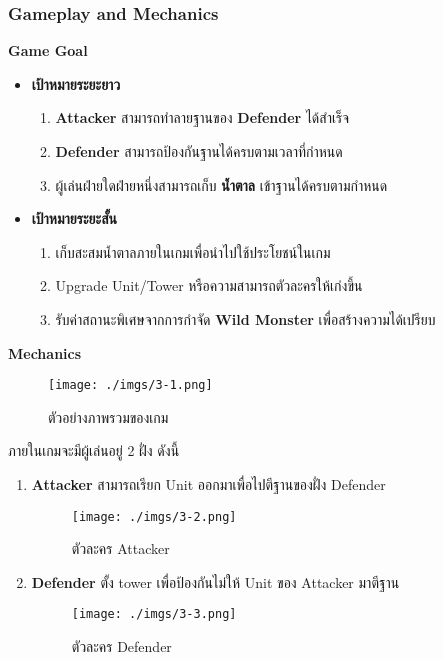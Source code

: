 \documentclass[12pt,oneside,openright,a4paper]{cpe-thai-project}
\begin{document}
\subsubsection{Gameplay and Mechanics}
\textbf{Game Goal}
\begin{itemize}
  \item{\textbf{เป้าหมายระยะยาว}}
  \begin{enumerate}
    \item \textbf{Attacker} สามารถทำลายฐานของ \textbf{Defender} ได้สำเร็จ
    \item \textbf{Defender} สามารถป้องกันฐานได้ครบตามเวลาที่กำหนด
    \item ผู้เล่นฝ่ายใดฝ่ายหนึ่งสามารถเก็บ \textbf{น้ำตาล} เข้าฐานได้ครบตามกำหนด
  \end{enumerate}
  
  \item{\textbf{เป้าหมายระยะสั้น}}
  \begin{enumerate}
    \item เก็บสะสมน้ำตาลภายในเกมเพื่อนำไปใช้ประโยชน์ในเกม
    \item Upgrade Unit/Tower หรือความสามารถตัวละครให้เก่งขึ้น
    \item รับค่าสถานะพิเศษจากการกำจัด \textbf{Wild Monster} เพื่อสร้างความได้เปรียบ
  \end{enumerate}
\end{itemize}

\textbf{Mechanics} 

\begin{figure}[H]\centering
  \texttt{[image: ./imgs/3-1.png]}
  \caption{ตัวอย่างภาพรวมของเกม}\label{fig:3-1}
\end{figure}

ภายในเกมจะมีผู้เล่นอยู่ 2 ฝั่ง ดังนี้
\begin{enumerate}
  \item \textbf{Attacker} สามารถเรียก Unit ออกมาเพื่อไปตีฐานของฝั่ง Defender
  \begin{figure}[H]\centering
    \texttt{[image: ./imgs/3-2.png]}
    \caption{ตัวละคร Attacker}\label{fig:3-2}
  \end{figure}
  \item \textbf{Defender} ตั้ง tower เพื่อป้องกันไม่ให้ Unit ของ Attacker มาตีฐาน
  \begin{figure}[H]\centering
    \texttt{[image: ./imgs/3-3.png]}
    \caption{ตัวละคร Defender}\label{fig:3-3}
  \end{figure}
\end{enumerate}
\end{document}
